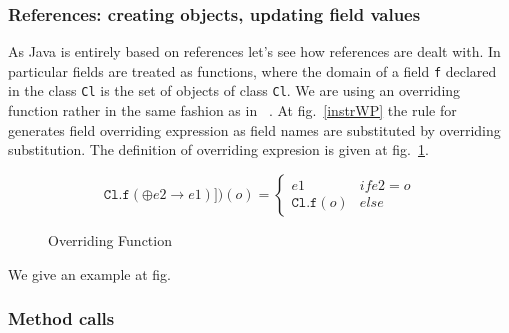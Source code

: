 \subsubsection{References: creating objects, updating field values}
As Java is entirely based on references let's see how references are dealt with.
In particular fields are treated as functions, where the domain of a field \texttt{f} 
declared in the class \texttt{Cl} is the set of objects of class \texttt{Cl}.
We are using an overriding function rather in the same fashion as in ~\cite{B00ppp}. 
At fig.~\ref{instrWP} the rule for  generates field overriding expression 
as field names are substituted by overriding substitution. The definition of overriding expresion is
given at fig.~\ref{override}.

\begin{figure}
$$
 \texttt{Cl.f}(\oplus e2 \rightarrow e1)])(o) = \left\{ \begin{array} {ll}
						       e1 & if e2 = o \\
					               \texttt{Cl.f}(o)	& else 
	\end{array}\right. 
$$ 
\caption{Overriding Function}
\label{override}
\end{figure}
We give an example at fig.%



\subsubsection{Method calls}
